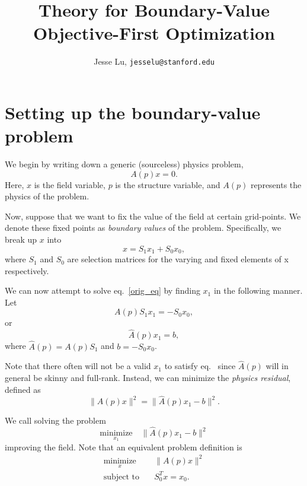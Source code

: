 \documentclass{article}
\title{Theory for Boundary-Value Objective-First Optimization}
\author{Jesse Lu, \texttt{jesselu@stanford.edu}}
\newcommand{\be}{\begin{equation}}
\newcommand{\ee}{\end{equation}}
\newcommand{\MIN}[1]{\underset{#1}{\text{minimize}}\quad}
\newcommand{\ST}{\text{subject to}\quad}
\begin{document}
\maketitle
\tableofcontents

\section{Setting up the boundary-value problem}
We begin by writing down a generic (sourceless) physics problem, 
\be A(p)x = 0. \label{orig_eq} \ee
Here, $x$ is the field variable, $p$ is the structure variable, and $A(p)$ represents the physics of the problem.

Now, suppose that we want to fix the value of the field at certain grid-points. 
We denote these fixed points as \emph{boundary values} of the problem.
Specifically, we break up $x$ into
\be x = S_1 x_1 + S_0 x_0, \ee
where $S_1$ and $S_0$ are selection matrices for the varying and fixed elements of x respectively. 

We can now attempt to solve eq.~\ref{orig_eq} by finding $x_1$ in the following manner. Let
\be A(p)S_1 x_1 = -S_0 x_0, \ee
or
\be \hat{A}(p) x_1 = b, \label{field_eq} \ee
where $\hat{A}(p) = A(p) S_1$ and $b = -S_0 x_0$.

Note that there often will not be a valid $x_1$ to satisfy eq.~\cite{field_eq} since $\hat{A}(p)$ will in general be skinny and full-rank. 
Instead, we can minimize the \emph{physics residual}, defined as
\be \| A(p)x \|^2 = \| \hat{A}(p) x_1 - b \|^2. \ee

We call solving the problem
\be \MIN{x_1} \| \hat{A}(p)x_1 - b \|^2\ee
improving the field.
Note that an equivalent problem definition is
\begin{align} 
    \MIN{x}& \| A(p)x \|^2 \\
    \ST& S_0^T x = x_0.
\end{align}


\begin{thebibliography}{99}
\end{thebibliography}
\end{document}
